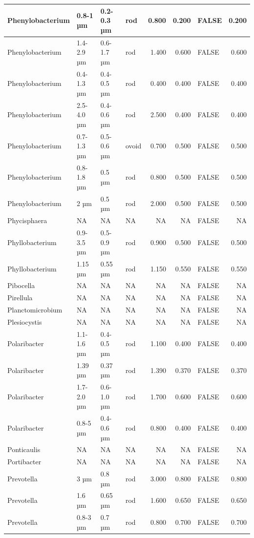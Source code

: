 \documentclass[
]{article}
\begin{document}
\begin{table}
\begin{tabular}{l|l|l|l|r|r|l|r}
\hline
Phenylobacterium & 0.8-1 µm & 0.2-0.3 µm & rod & 0.800 & 0.200 & FALSE & 0.200\\
\hline
Phenylobacterium & 1.4-2.9 µm & 0.6-1.7 µm & rod & 1.400 & 0.600 & FALSE & 0.600\\
\hline
Phenylobacterium & 0.4-1.3 µm & 0.4-0.5 µm & rod & 0.400 & 0.400 & FALSE & 0.400\\
\hline
Phenylobacterium & 2.5-4.0 µm & 0.4-0.6 µm & rod & 2.500 & 0.400 & FALSE & 0.400\\
\hline
Phenylobacterium & 0.7-1.3 µm & 0.5-0.6 µm & ovoid & 0.700 & 0.500 & FALSE & 0.500\\
\hline
Phenylobacterium & 0.8-1.8 µm & 0.5 µm & rod & 0.800 & 0.500 & FALSE & 0.500\\
\hline
Phenylobacterium & 2 µm & 0.5 µm & rod & 2.000 & 0.500 & FALSE & 0.500\\
\hline
Phycisphaera & NA & NA & NA & NA & NA & FALSE & NA\\
\hline
Phyllobacterium & 0.9-3.5 µm & 0.5-0.9 µm & rod & 0.900 & 0.500 & FALSE & 0.500\\
\hline
Phyllobacterium & 1.15 µm & 0.55 µm & rod & 1.150 & 0.550 & FALSE & 0.550\\
\hline
Pibocella & NA & NA & NA & NA & NA & FALSE & NA\\
\hline
Pirellula & NA & NA & NA & NA & NA & FALSE & NA\\
\hline
Planctomicrobium & NA & NA & NA & NA & NA & FALSE & NA\\
\hline
Plesiocystis & NA & NA & NA & NA & NA & FALSE & NA\\
\hline
Polaribacter & 1.1-1.6 µm & 0.4-0.5 µm & rod & 1.100 & 0.400 & FALSE & 0.400\\
\hline
Polaribacter & 1.39 µm & 0.37 µm & rod & 1.390 & 0.370 & FALSE & 0.370\\
\hline
Polaribacter & 1.7-2.0 µm & 0.6-1.0 µm & rod & 1.700 & 0.600 & FALSE & 0.600\\
\hline
Polaribacter & 0.8-5 µm & 0.4-0.6 µm & rod & 0.800 & 0.400 & FALSE & 0.400\\
\hline
Ponticaulis & NA & NA & NA & NA & NA & FALSE & NA\\
\hline
Portibacter & NA & NA & NA & NA & NA & FALSE & NA\\
\hline
Prevotella & 3 µm & 0.8 µm & rod & 3.000 & 0.800 & FALSE & 0.800\\
\hline
Prevotella & 1.6 µm & 0.65 µm & rod & 1.600 & 0.650 & FALSE & 0.650\\
\hline
Prevotella & 0.8-3 µm & 0.7 µm & rod & 0.800 & 0.700 & FALSE & 0.700\\

\end{tabular}
\end{table}
\end{document}
